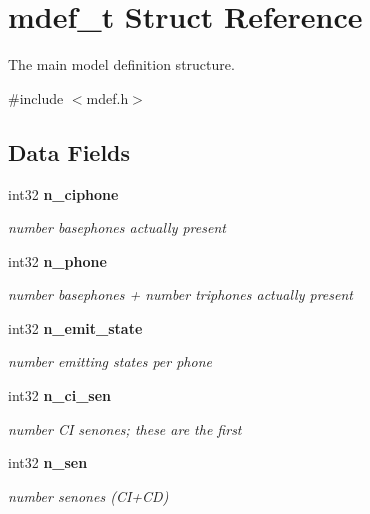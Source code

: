 \section{mdef\+\_\+t Struct Reference}
\label{structmdef__t}


The main model definition structure.  




{\ttfamily \#include $<$mdef.\+h$>$}

\subsection*{Data Fields}
\begin{DoxyCompactItemize}
\item 
\mbox{\label{structmdef__t_af460d8d703782cf50ed99164cee17347}} 
int32 \textbf{ n\+\_\+ciphone}
\begin{DoxyCompactList}\small\item\em number basephones actually present \end{DoxyCompactList}\item 
\mbox{\label{structmdef__t_a987f0b9bc4c951ac031f5d283960bd9f}} 
int32 \textbf{ n\+\_\+phone}
\begin{DoxyCompactList}\small\item\em number basephones + number triphones actually present \end{DoxyCompactList}\item 
\mbox{\label{structmdef__t_a4a7ffa9d1b9a95a3bf3cca7bd955020a}} 
int32 \textbf{ n\+\_\+emit\+\_\+state}
\begin{DoxyCompactList}\small\item\em number emitting states per phone \end{DoxyCompactList}\item 
\mbox{\label{structmdef__t_a68c3cc85b849363609fd5dadf412a38c}} 
int32 \textbf{ n\+\_\+ci\+\_\+sen}
\begin{DoxyCompactList}\small\item\em number CI senones; these are the first \end{DoxyCompactList}\item 
\mbox{\label{structmdef__t_a966e28ae25bd8e766dbe81549cbdcd36}} 
int32 \textbf{ n\+\_\+sen}
\begin{DoxyCompactList}\small\item\em number senones (C\+I+\+CD) \end{DoxyCompactList}\item 
\mbox{\label{structmdef__t_a44d1d9fd99db66f1c37937e89172fed9}} 

\end{DoxyCompactItemize}
